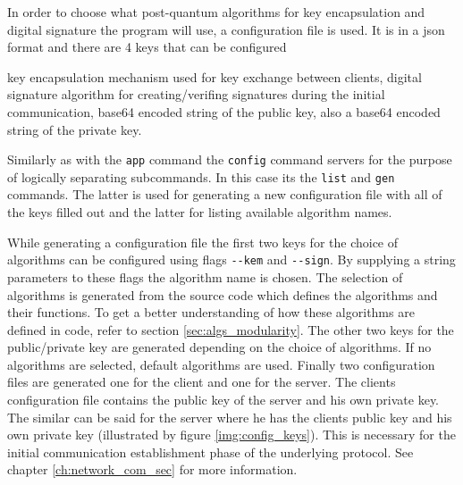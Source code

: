 In order to choose what post-quantum algorithms for key encapsulation and digital signature the program will use, a configuration file is used. It is in a json format and there are 4 keys that can be configured
\begin{itemize}
  key encapsulation mechanism used for key exchange between clients,
  digital signature algorithm for creating/verifing signatures during the initial communication,
  base64 encoded string of the public key,
  also a base64 encoded string of the private key.
\end{itemize}
Similarly as with the \texttt{app} command the \texttt{config} command servers for the purpose of logically separating subcommands. In this case its the \texttt{list} and \texttt{gen} commands. The latter is used for generating a new configuration file with all of the keys filled out and the latter for listing available algorithm names.

While generating a configuration file the first two keys for the choice of algorithms can be configured using flags \texttt{-\--kem} and \texttt{-\--sign}. By supplying a string parameters to these flags the algorithm name is chosen. The selection of algorithms is generated from the source code which defines the algorithms and their functions. To get a better understanding of how these algorithms are defined in code, refer to section \ref{sec:algs_modularity}. The other two keys for the public/private key are generated depending on the choice of algorithms. If no algorithms are selected, default algorithms are used. Finally two configuration files are generated one for the client and one for the server. The clients configuration file contains the public key of the server and his own private key. The similar can be said for the server where he has the clients public key and his own private key (illustrated by figure \ref{img:config_keys}). This is necessary for the initial communication establishment phase of the underlying protocol. See chapter \ref{ch:network_com_sec} for more information.
